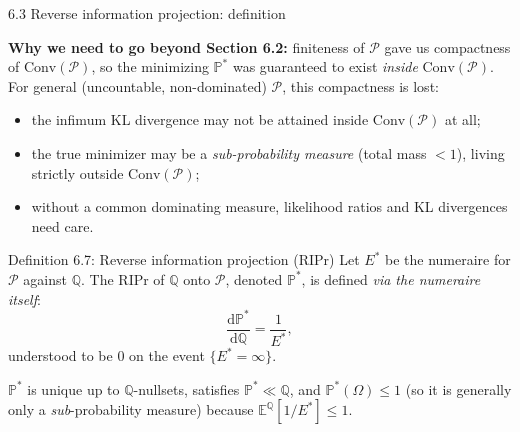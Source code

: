 \documentclass[aspectratio=169,10pt]{beamer}
\newcommand{\bE}{\mathbb{E}}
\newcommand{\bP}{\mathbb{P}}
\newcommand{\bQ}{\mathbb{Q}}
\newcommand{\cP}{\mathcal{P}}
\newcommand{\Conv}{\mathrm{Conv}}
\begin{document}
\begin{frame}{6.3 Reverse information projection: definition}

\textbf{Why we need to go beyond Section 6.2:} finiteness of $\cP$ gave
us compactness of $\Conv(\cP)$, so the minimizing $\bP^*$ was
guaranteed to exist \emph{inside} $\Conv(\cP)$. For general
(uncountable, non-dominated) $\cP$, this compactness is lost:
\begin{itemize}
\item the infimum KL divergence may not be attained inside $\Conv(\cP)$ at all;
\item the true minimizer may be a \emph{sub-probability measure}
(total mass $<1$), living strictly outside $\Conv(\cP)$;
\item without a common dominating measure, likelihood ratios and KL
divergences need care.
\end{itemize}

\begin{block}{Definition 6.7: Reverse information projection (RIPr)}
Let $E^*$ be the numeraire for $\cP$ against $\bQ$. The RIPr of $\bQ$
onto $\cP$, denoted $\bP^*$, is defined \emph{via the numeraire itself}:
\[
\frac{\mathrm{d}\bP^*}{\mathrm{d}\bQ} = \frac{1}{E^*},
\]
understood to be $0$ on the event $\{E^* = \infty\}$.
\end{block}
$\bP^*$ is unique up to $\bQ$-nullsets, satisfies $\bP^* \ll \bQ$, and
$\bP^*(\Omega) \le 1$ (so it is generally only a \emph{sub}-probability
measure) because $\bE^{\bQ}[1/E^*] \le 1$.
\end{frame}
\end{document}
